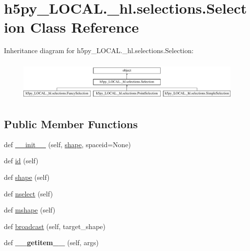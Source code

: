 \hypertarget{classh5py__LOCAL_1_1__hl_1_1selections_1_1Selection}{}\section{h5py\+\_\+\+L\+O\+C\+A\+L.\+\_\+hl.\+selections.\+Selection Class Reference}
\label{classh5py__LOCAL_1_1__hl_1_1selections_1_1Selection}
Inheritance diagram for h5py\+\_\+\+L\+O\+C\+A\+L.\+\_\+hl.\+selections.\+Selection\+:\begin{figure}[H]
\begin{center}
\leavevmode
\includegraphics[height=2.066421cm]{classh5py__LOCAL_1_1__hl_1_1selections_1_1Selection}
\end{center}
\end{figure}
\subsection*{Public Member Functions}
\begin{DoxyCompactItemize}
\item 
def \hyperlink{classh5py__LOCAL_1_1__hl_1_1selections_1_1Selection_aaa51e08873bb726131b50dd33009beda}{\+\_\+\+\_\+init\+\_\+\+\_\+} (self, \hyperlink{classh5py__LOCAL_1_1__hl_1_1selections_1_1Selection_ac3b41d10d9a5838904dbad4de6428eac}{shape}, spaceid=None)
\item 
def \hyperlink{classh5py__LOCAL_1_1__hl_1_1selections_1_1Selection_a73a470fa2f543e6d4ad69424303a2c32}{id} (self)
\item 
def \hyperlink{classh5py__LOCAL_1_1__hl_1_1selections_1_1Selection_ac3b41d10d9a5838904dbad4de6428eac}{shape} (self)
\item 
def \hyperlink{classh5py__LOCAL_1_1__hl_1_1selections_1_1Selection_a430223ccffa1a0f8fa2068f920b7a1aa}{nselect} (self)
\item 
def \hyperlink{classh5py__LOCAL_1_1__hl_1_1selections_1_1Selection_ac5b25f87335245ea5b1511ca3635e395}{mshape} (self)
\item 
def \hyperlink{classh5py__LOCAL_1_1__hl_1_1selections_1_1Selection_a69e0f4c2d6b58878fcb196ad136c4101}{broadcast} (self, target\+\_\+shape)
\item 
\mbox{\label{classh5py__LOCAL_1_1__hl_1_1selections_1_1Selection_a4cc9d7df3ea15b25224a8f472470a043}} 
def {\bfseries \+\_\+\+\_\+getitem\+\_\+\+\_\+} (self, args)
\end{DoxyCompactItemize}



